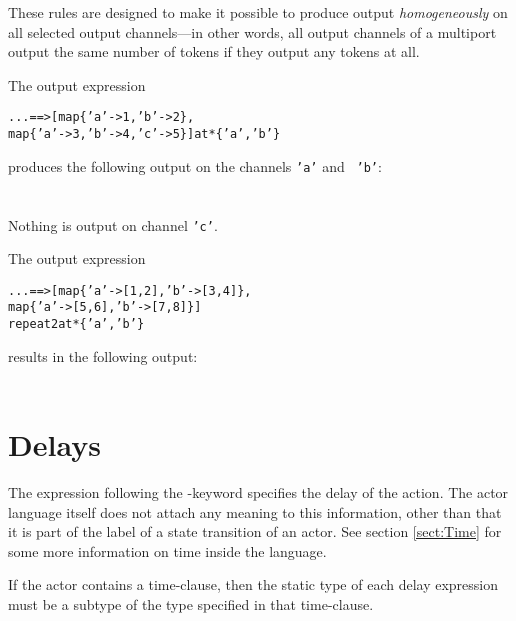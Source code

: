 
These rules are designed to
make it possible to produce output {\em homogeneously} on all selected
output channels---in other words, all output channels of a multiport
output the same number of tokens if they output any tokens at all.

\begin{example}
  The output expression
  \begin{alltt}   ... ==> [map \{'a'->1, 'b'->2\},
            map \{'a'->3, 'b'->4,'c'->5\}] at* \{'a', 'b'\} \end{alltt}  
  produces the following output on the channels {\tt 'a'} and {\tt
      'b'}:\\
  \\
  \\
  Nothing is output on channel {\tt 'c'}.

  The output expression
  \begin{alltt}   ... ==> [map \{'a'->[1, 2], 'b'->[3, 4]\}, 
            map \{'a'->[5, 6], 'b'->[7, 8]\}] 
            repeat 2 at* \{'a', 'b'\} \end{alltt} 
  results in the following output:\\
  \\
\end{example}



\section{Delays} \label{sect:Delays}



The expression following the \kwDelay-keyword specifies the delay of
the action. The actor language itself
does not attach any meaning to this information, other than that it is
part of the label of a state transition of an actor. See
section \ref{sect:Time} for some more information on time inside the
\Cal language.

If the actor contains a time-clause, then the static type of each
delay expression must be a subtype of the type specified in that
time-clause.

